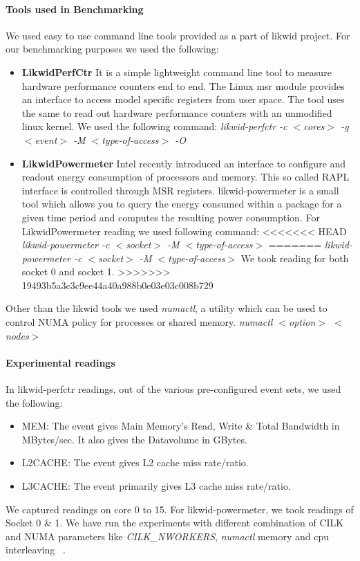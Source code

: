 \paragraph{Tools used in Benchmarking}
We used easy to use command line tools provided as a part of likwid
project. For our benchmarking purposes we used the following:
\begin{itemize}[leftmargin=*]
\item \textbf{LikwidPerfCtr}
It is a simple lightweight command line tool to measure hardware 
performance counters end to end. The Linux msr module provides
an interface to access model specific registers from user space.
The tool uses the same to read out hardware
performance counters with an unmodified linux kernel. We used the 
following command:\newline
\emph{likwid-perfctr -c $<$cores$>$ -g $<$event$>$ -M $<$type-of-access$>$ -O}
\item \textbf{LikwidPowermeter}
Intel recently introduced an interface to configure and readout 
energy consumption of processors and memory. This so called RAPL 
interface is controlled through MSR registers. likwid-powermeter 
is a small tool which allows you to query the energy consumed within 
a package for a given time period and computes the resulting power 
consumption. For LikwidPowermeter reading we used following command:\newline
<<<<<<< HEAD
\emph{likwid-powermeter -c $<$socket$>$ -M $<$type-of-access$>$}
=======
\emph{likwid-powermeter -c $<$socket$>$ -M $<$type-of-access$>$}\newline
We took reading for both socket 0 and socket 1.
>>>>>>> 19493b5a3c3c9ee44a40a988b0e03e03c008b729
\end{itemize}
Other than the likwid tools we used \emph{numactl}, a utility which can be 
used to control NUMA policy for processes or shared memory. \newline
\emph{numactl $<$option$>$ $<$nodes$>$}

\paragraph{Experimental readings}
In likwid-perfctr readings, out of the various pre-configured event sets, we 
used the following:
\begin{itemize}[leftmargin=*]
\item MEM: The event gives Main Memory's Read, Write \& Total 
Bandwidth in MBytes/sec. It also gives the Datavolume in GBytes.
\item L2CACHE: The event gives L2 cache miss rate/ratio.
\item L3CACHE: The event primarily gives L3 cache miss rate/ratio.
\end{itemize}
We captured readings on core 0 to 15.\newline
For likwid-powermeter, we took readings of Socket 0 \& 1.\newline
We have run the experiments with different
combination of CILK and NUMA parameters like \emph{CILK\_NWORKERS},
\emph{numactl} memory and cpu interleaving ~\cite{NUMA-MAN}.

